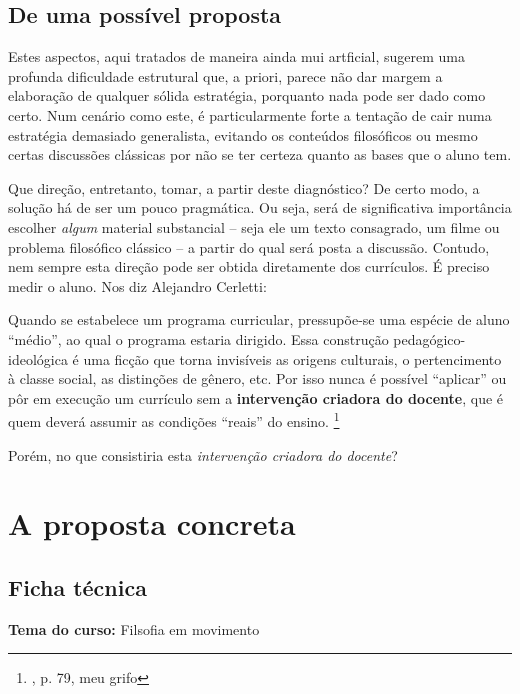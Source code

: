 \documentclass[12pt,a4paper]{article}
\newenvironment{citac}{
	\begin{addmargin}[4cm]{1em} \footnotesize}{\normalfont \end{addmargin}
}
\begin{document}
	\subsection*{De uma possível proposta}
	
	Estes aspectos, aqui tratados de maneira ainda mui artficial, 
	sugerem uma profunda dificuldade estrutural que, a priori, parece 
	não dar margem a elaboração de qualquer sólida estratégia, porquanto 
	nada pode ser dado como certo. Num cenário como este, é 
	particularmente forte a tentação de cair numa estratégia demasiado 
	generalista, evitando os conteúdos filosóficos ou mesmo certas 
	discussões clássicas por não se ter certeza quanto as bases que 
	o aluno tem. 

	Que direção, entretanto, tomar, a partir deste diagnóstico? De certo 
	modo, a solução há de ser um pouco pragmática. Ou seja, será de 
	significativa importância escolher \emph{algum} material substancial
	-- seja ele um texto consagrado, um filme ou problema filosófico 
	clássico -- a partir do qual será posta a discussão. Contudo, nem 
	sempre esta direção pode ser obtida diretamente dos currículos. É 
	preciso medir o aluno. Nos diz Alejandro Cerletti: 

	\begin{citac}
		Quando se estabelece um programa curricular, pressupõe-se 
		uma espécie de aluno “médio”, ao qual o programa estaria 
		dirigido. Essa construção pedagógico-ideológica é uma 
		ficção que torna invisíveis as origens culturais, o 
		pertencimento à classe social, as distinções de gênero, 
		etc. Por isso nunca é possível “aplicar” ou pôr em 
		execução um currículo sem a \textbf{intervenção 
		criadora do docente}, que é quem deverá assumir as 
		condições “reais” do ensino. 
		\footnote{\cite{cerletti}, p. 79, meu grifo}
	\end{citac}

	Porém, no que consistiria esta \emph{intervenção criadora do docente}? 

	
	\newpage
	
	\section{A proposta concreta}
	
	\subsection{Ficha técnica}

	\textbf{Tema do curso:} Filsofia em movimento
\end{document}
